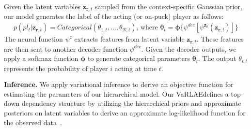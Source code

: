 \documentclass{article}
\newcommand{\latentvariables}{\mathbf{z}}
\newcommand{\state}{\mathbf{s}}
\newcommand{\action}{\mathbf{a}}
\newcommand{\reward}{\boldsymbol{r}}
\newcommand{\player}{pl}
\newcommand{\pindex}{i}
\newcommand{\softmax}{\boldsymbol{\phi}}
\newcommand{\BernoulliParameters}{\theta}
\newcommand{\system}{VaRLAE\;}
\begin{document}
Given the latent variables $\latentvariables_{\reward,t}$ sampled from the context-specific Gaussian prior, %
our model generates the label of the acting (or on-puck) player as follows:
\begin{align}
    p(\player_{t}| \latentvariables_{\reward,t})=Categorical(\BernoulliParameters_{1,t},\dots,\BernoulliParameters_{N,t})\text{, where }
    \boldsymbol{\BernoulliParameters}_{t}=\softmax\{\psi^{dec}[\psi^{\latentvariables_{\reward}}(\latentvariables_{\reward,t})]\}
\end{align}
The neural function $\psi^{z}$ extracts features from latent variable $\latentvariables_{\reward,t}$.
These features are then sent to another decoder function $\psi^{dec}$. Given the decoder outputs, we apply a softmax function $\softmax$ to generate categorical parameters $\boldsymbol{\BernoulliParameters}_{t}$. The output $\BernoulliParameters_{\pindex,t}$ represents the probability of player $\pindex$ acting at time $t$. 

{\bf Inference.}
We apply variational inference to derive an objective function for estimating the parameters of our hierarchical model. 
Our \system defines a top-down dependency structure by utilizing the hierarchical priors and approximate posteriors on latent variables to derive an approximate log-likelihood function for the observed data~\cite{SonderbyLadderVAE16,kingma2013auto}. 
\end{document}
